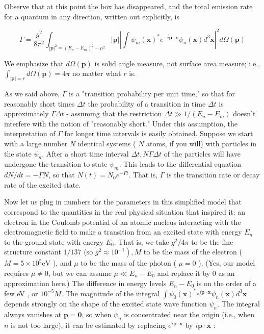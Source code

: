 \documentclass[10pt, letterpaper]{article}
\begin{document}
Observe that at this point the box has disappeared, and the total emission rate for a quantum in any direction, written out explicitly, is

$$
\Gamma=\frac{g^{2}}{8 \pi^{2}} \int_{|\mathbf{p}|^{2}=\left(E_{n}-E_{m}\right)^{2}-\mu^{2}}|\mathbf{p}|\left|\int \psi_{m}(\mathbf{x})^{*} e^{-i \mathbf{p} \cdot \mathbf{x}} \psi_{n}(\mathbf{x}) d^{3} \mathbf{x}\right|^{2} d \Omega(\mathbf{p})
$$

We emphasize that $d \Omega(\mathbf{p})$ is solid angle measure, not surface area measure; i.e., $\int_{|\mathbf{p}|=r} d \Omega(\mathbf{p})=4 \pi$ no matter what $r$ is.

As we said above, $\Gamma$ is a "transition probability per unit time," so that for reasonably short times $\Delta t$ the probability of a transition in time $\Delta t$ is approximately $\Gamma \Delta t$ - assuming that the restriction $\Delta t \gg 1 /\left(E_{n}-E_{m}\right)$ doesn't interfere with the notion of "reasonably short." Under this assumption, the interpretation of $\Gamma$ for longer time intervals is easily obtained. Suppose we start with a large number $N$ identical systems ( $N$ atoms, if you will) with particles in the state $\psi_{n}$. After a short time interval $\Delta t, N \Gamma \Delta t$ of the particles will have undergone the transition to state $\psi_{m}$. This leads to the differential equation $d N / d t=-\Gamma N$, so that $N(t)=N_{0} e^{-\Gamma t}$. That is, $\Gamma$ is the transition rate or decay rate of the excited state.

Now let us plug in numbers for the parameters in this simplified model that correspond to the quantities in the real physical situation that inspired it: an electron in the Coulomb potential of an atomic nucleus interacting with the electromagnetic field to make a transition from an excited state with energy $E_{n}$ to the ground state with energy $E_{0}$. That is, we take $g^{2} / 4 \pi$ to be the fine structure constant $1 / 137$ (so $\left.g^{2} \approx 10^{-1}\right), M$ to be the mass of the electron ( $M=5 \times 10^{5} \mathrm{eV}$ ), and $\mu$ to be the mass of the photon ( $\mu=0$ ). (Yes, our model requires $\mu \neq 0$, but we can assume $\mu \ll E_{n}-E_{0}$ and replace it by 0 as an approximation here.) The difference in energy levels $E_{n}-E_{0}$ is on the order of a few eV , or $10^{-5} M$. The magnitude of the integral $\int \psi_{0}(\mathbf{x})^{*} e^{i \mathbf{p} \cdot \mathbf{x}} \psi_{n}(\mathbf{x}) d^{3} \mathbf{x}$ depends strongly on the shape of the excited state wave function $\psi_{n}$. The integral always vanishes at $\mathbf{p}=\mathbf{0}$, so when $\psi_{n}$ is concentrated near the origin (i.e., when $n$ is not too large), it can be estimated by replacing $e^{i \mathbf{p} \cdot \mathbf{x}}$ by $i \mathbf{p} \cdot \mathbf{x}$ :
\end{document}
